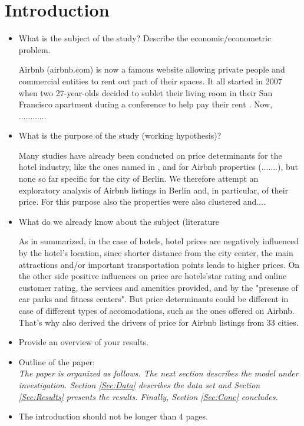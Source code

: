 \section{Introduction}

\begin{itemize}

    \item What is the subject of the study? Describe the
        economic/econometric problem.
        
        Airbnb (airbnb.com) is now a famous website allowing private people and commercial entities to rent out part of their spaces. It all started in 2007 when two 27-year-olds decided to sublet their living room in their San Francisco apartment during a conference to help pay their rent \citep{airbnbstory:2012}. Now, ............

    \item What is the purpose of the study (working hypothesis)?
    
	Many studies have already been conducted on price determinants for the hotel industry, like the ones named in    \cite{wang2017price}, and for Airbnb properties (.......), but none so far specific for the city of Berlin. We therefore attempt an exploratory analysis of Airbnb listings in Berlin and, in particular, of their price. For this purpose also the properties were also clustered and....

    \item What do we already know about the subject (literature
        
    As in \cite{wang2017price} summarized, in the case of hotels, hotel prices are negatively influenced by the hotel's location, since shorter distance from the city center, the main attractions and/or important transportation points leads to higher prices. On the other side positive influences on price are hotels'star rating and online customer rating, the services and amenities provided, and by the "presense of car parks and fitness centers". But price determinants could be different in case of different types of accomodations, such as the ones offered on Airbnb. That's why \cite{wang2017price} also derived the drivers of price for Airbnb listings from 33 cities.


    \item Provide an overview of your results.


    \item Outline of the paper:\\
        {\it The paper is organized as follows. The next section describes the
        model under investigation. Section \ref{Sec:Data} describes the data set
        and Section \ref{Sec:Results} presents the results. Finally, Section
        \ref{Sec:Conc} concludes.}

    \item The introduction should not be longer than 4 pages.

\end{itemize}
